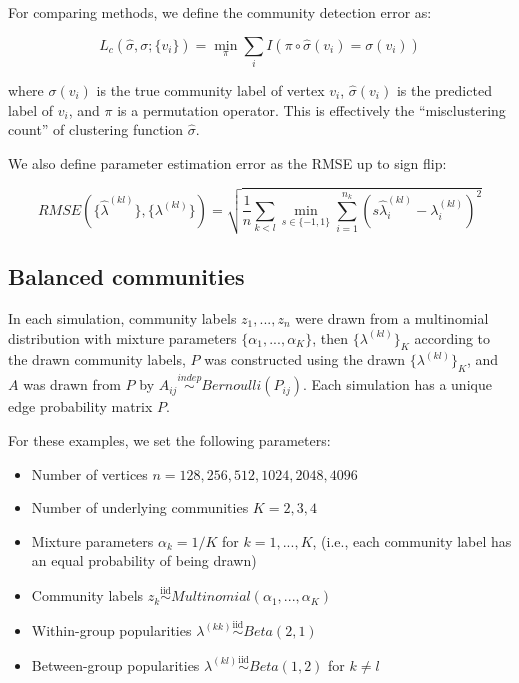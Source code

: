 \documentclass[12pt]{article}
\providecommand{\tightlist}{%
  \setlength{\itemsep}{0pt}\setlength{\parskip}{0pt}}
\begin{document}
For comparing methods, we define the community detection error as:

\[L_c(\hat{\sigma}, \sigma; \{v_i\}) = 
\min_\pi \sum_i I(\pi \circ \hat{\sigma}(v_i) = \sigma(v_i))\]

where \(\sigma(v_i)\) is the true community label of vertex \(v_i\),
\(\hat{\sigma}(v_i)\) is the predicted label of \(v_i\), and \(\pi\) is
a permutation operator. This is effectively the ``misclustering count''
of clustering function \(\hat{\sigma}\).

We also define parameter estimation error as the RMSE up to sign flip:

\[RMSE(\{\hat{\lambda}^{(kl)}\}, \{\lambda^{(kl)}\}) = 
\sqrt{\frac{1}{n} \sum_{k < l} \min_{s \in \{-1, 1\}} 
\sum_{i = 1}^{n_k} 
(s \hat{\lambda}^{(kl)}_i - \lambda^{(kl)}_i)^2}\]

\hypertarget{balanced-communities}{%
\subsection{Balanced communities}\label{balanced-communities}}

In each simulation, community labels \(z_1, ..., z_n\) were drawn from a
multinomial distribution with mixture parameters
\(\{\alpha_1, ..., \alpha_K\}\), then \(\{\lambda^{(kl)}\}_K\) according
to the drawn community labels, \(P\) was constructed using the drawn
\(\{\lambda^{(kl)}\}_K\), and \(A\) was drawn from \(P\) by
\(A_{ij} \stackrel{indep}{\sim} Bernoulli(P_{ij})\). Each simulation has
a unique edge probability matrix \(P\).

For these examples, we set the following parameters:

\begin{itemize}
\tightlist
\item
  Number of vertices \(n = 128, 256, 512, 1024, 2048, 4096\)
\item
  Number of underlying communities \(K = 2, 3, 4\)
\item
  Mixture parameters \(\alpha_k = 1 / K\) for \(k = 1, ..., K\), (i.e.,
  each community label has an equal probability of being drawn)
\item
  Community labels
  \(z_k \stackrel{\text{iid}}{\sim}Multinomial(\alpha_1, ..., \alpha_K)\)
\item
  Within-group popularities
  \(\lambda^{(kk)} \stackrel{\text{iid}}{\sim}Beta(2, 1)\)
\item
  Between-group popularities
  \(\lambda^{(kl)} \stackrel{\text{iid}}{\sim}Beta(1, 2)\) for
  \(k \neq l\)
\end{itemize}
\end{document}
